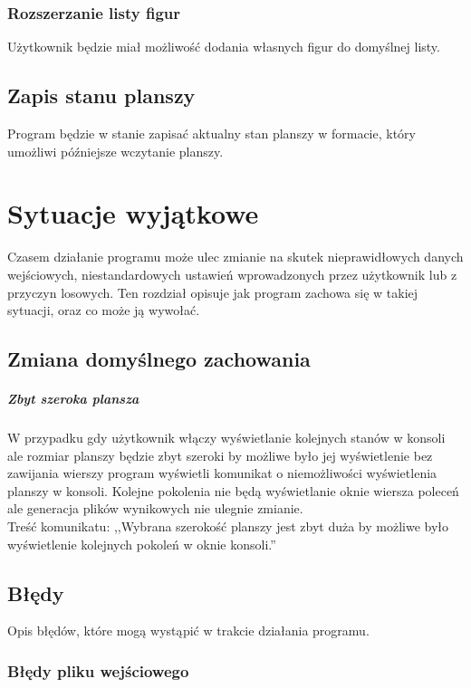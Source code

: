 \documentclass{report}
\begin{document}
\subsection{Rozszerzanie listy figur}
Użytkownik będzie miał możliwość dodania własnych figur do domyślnej listy.

\section{Zapis stanu planszy}
Program będzie w stanie zapisać aktualny stan planszy w formacie, który umożliwi późniejsze  wczytanie planszy.

\chapter{Sytuacje wyjątkowe}
Czasem działanie programu może ulec zmianie na skutek nieprawidłowych danych wejściowych, niestandardowych ustawień wprowadzonych przez użytkownik lub z przyczyn losowych. Ten rozdział opisuje jak program zachowa się w takiej sytuacji, oraz co może ją wywołać.

\section{Zmiana domyślnego zachowania}
\paragraph{Zbyt szeroka plansza}
W przypadku gdy użytkownik włączy wyświetlanie kolejnych stanów w konsoli ale rozmiar planszy będzie zbyt szeroki by możliwe było jej wyświetlenie bez zawijania wierszy program wyświetli komunikat o niemożliwości wyświetlenia planszy w konsoli. Kolejne pokolenia nie będą wyświetlanie oknie wiersza poleceń ale generacja plików wynikowych nie ulegnie zmianie. \\
Treść komunikatu: ,,Wybrana szerokość planszy jest zbyt duża by możliwe było wyświetlenie kolejnych pokoleń w oknie konsoli.''

\section{Błędy}
Opis błędów, które mogą wystąpić w trakcie działania programu.

\subsection{Błędy pliku wejściowego}
\end{document}
